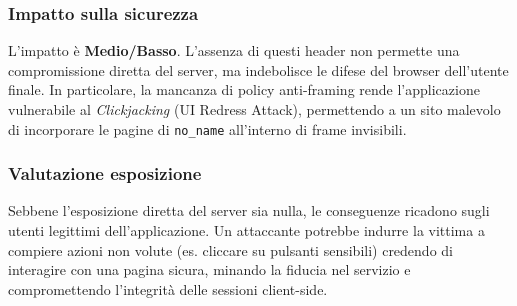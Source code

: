 \documentclass[11pt]{article}
\newcommand{\sev}[2]{%
  \setlength{\fboxsep}{3pt}%
  \colorbox{#1}{\textcolor{white}{\small\textbf{#2}}}%
}
\newcommand{\sevCRIT}{\sev{sevCritico}{CRITICO}}
\begin{document}
\subsubsection{Impatto sulla sicurezza}
L'impatto è \textbf{Medio/Basso}. L'assenza di questi header non permette una compromissione diretta del server, ma indebolisce le difese del browser dell'utente finale. In particolare, la mancanza di policy anti-framing rende l'applicazione vulnerabile al \textit{Clickjacking} (UI Redress Attack), permettendo a un sito malevolo di incorporare le pagine di \texttt{no\_name} all'interno di frame invisibili.

\subsubsection{Valutazione esposizione}
Sebbene l'esposizione diretta del server sia nulla, le conseguenze ricadono sugli utenti legittimi dell'applicazione. Un attaccante potrebbe indurre la vittima a compiere azioni non volute (es. cliccare su pulsanti sensibili) credendo di interagire con una pagina sicura, minando la fiducia nel servizio e compromettendo l'integrità delle sessioni client-side.

%
\end{document}
